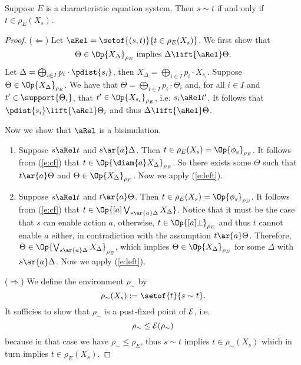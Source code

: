 \documentclass{article}
\def \BISI{\sim}
\def \CE{{\cal E}}
\newcommand{\boxm}[1]{[#1]}
\begin{document}
\begin{theorem}\label{t:ces}
Suppose $E$ is a characteristic equation system. Then $s\BISI t$ if
and only if $t\in \rho_E(X_s)$.
\end{theorem}
\begin{proof}
($\Leftarrow$) Let $\aRel=\setof{(s,t)}{t\in \rho_E(X_s)}$. We
  first show that
\begin{equation}\label{e:left}
\Theta\in\Op{X_\Delta}_{\rho_E}\ {\rm implies}\
\Delta\lift{\aRel}\Theta.
\end{equation}
Let $\Delta=\bigoplus_{i\in I}p_i\cdot \pdist{s_i}$, then $X_\Delta
= \bigoplus_{i\in I}p_i\cdot X_{s_i}$. Suppose
$\Theta\in\Op{X_\Delta}_{\rho_E}$. We have that
$\Theta=\bigoplus_{i\in I}p_i\cdot\Theta_i$ and, for all $i\in I$
and $t'\in\support{\Theta_i}$, that $t'\in \Op{X_{s_i}}_{\rho_E}$,
i.e. $s_i \aRel t'$. It follows that $\pdist{s_i} \lift{\aRel}
\Theta_i$ and thus
 $\Delta \lift{\aRel} \Theta$.

Now we show that $\aRel$ is a bisimulation.
\begin{enumerate}
\item Suppose $s\aRel t$ and $s\ar{a}\Delta$. Then
  $t\in\rho_E(X_s)=\Op{\phi_s}_{\rho_E}$. It follows from
  (\ref{e:cf}) that $t\in\Op{\diam{a}X_\Delta}_{\rho_E}$. So
  there exists some $\Theta$ such that $t\ar{a}\Theta$ and
  $\Theta \in \Op{X_\Delta}_{\rho_E}$. Now we apply (\ref{e:left}).

\item Suppose $s\aRel t$ and $t\ar{a}\Theta$. Then
  $t\in\rho_E(X_s)=\Op{\phi_s}_{\rho_E}$. It follows from
  (\ref{e:cf}) that $t\in\Op{\boxm{a}\bigvee_{s\ar{a}\Delta}
  X_{\Delta}}$. Notice that it
  must be the case that $s$ can enable action $a$, otherwise, $t\in
  \Op{[a]\bot}_{\rho_E}$ and thus $t$ cannot enable $a$ either, in contradiction
  with the assumption $t\ar{a}\Theta$. Therefore,
  $\Theta\in\Op{\bigvee_{s\ar{a}\Delta}X_{\Delta}}_{\rho_E}$,
  which implies
  $\Theta\in\Op{X_\Delta}_{\rho_E}$ for some $\Delta$ with
  $s\ar{a}\Delta$.
  Now we apply (\ref{e:left}).
\end{enumerate}

($\Rightarrow$) We define the environment $\rho_\BISI$ by
 \[\rho_\BISI(X_s):=\setof{t}{s\BISI t}.\]
 It sufficies to show that $\rho_\BISI$ is a post-fixed point of
 $\CE$, i.e.
\begin{equation}\label{e:post}
\rho_\BISI \leq \CE(\rho_\BISI)
\end{equation}
because in that case we have $\rho_\BISI \leq \rho_E$, thus $s\BISI
t$  implies $t\in\rho_\BISI(X_s)$ which in turn implies $t\in
\rho_E(X_s)$.


\end{proof}
\end{document}
